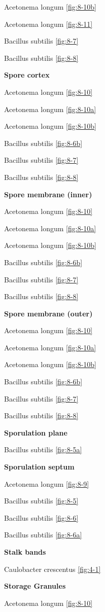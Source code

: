 \documentclass[]{tufte-book}
\begin{document}
Acetonema longum \ref{fig:8-10b}

Acetonema longum \ref{fig:8-11}

Bacillus subtilis \ref{fig:8-7}

Bacillus subtilis \ref{fig:8-8}

\textbf{Spore cortex}

Acetonema longum \ref{fig:8-10}

Acetonema longum \ref{fig:8-10a}

Acetonema longum \ref{fig:8-10b}

Bacillus subtilis \ref{fig:8-6b}

Bacillus subtilis \ref{fig:8-7}

Bacillus subtilis \ref{fig:8-8}

\textbf{Spore membrane (inner)}

Acetonema longum \ref{fig:8-10}

Acetonema longum \ref{fig:8-10a}

Acetonema longum \ref{fig:8-10b}

Bacillus subtilis \ref{fig:8-6b}

Bacillus subtilis \ref{fig:8-7}

Bacillus subtilis \ref{fig:8-8}

\textbf{Spore membrane (outer)}

Acetonema longum \ref{fig:8-10}

Acetonema longum \ref{fig:8-10a}

Acetonema longum \ref{fig:8-10b}

Bacillus subtilis \ref{fig:8-6b}

Bacillus subtilis \ref{fig:8-7}

Bacillus subtilis \ref{fig:8-8}

\textbf{Sporulation plane}

Bacillus subtilis \ref{fig:8-5a}

\textbf{Sporulation septum}

Acetonema longum \ref{fig:8-9}

Bacillus subtilis \ref{fig:8-5}

Bacillus subtilis \ref{fig:8-6}

Bacillus subtilis \ref{fig:8-6a}

\textbf{Stalk bands}

Caulobacter crescentus \ref{fig:4-1}

\textbf{Storage Granules}

Acetonema longum \ref{fig:8-10}
\end{document}
